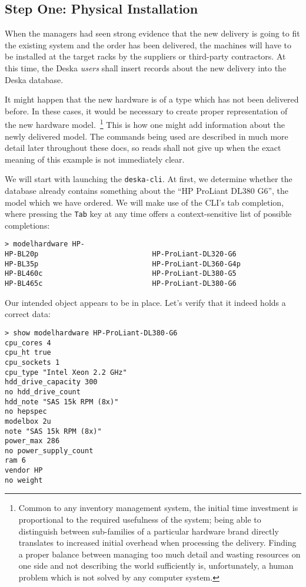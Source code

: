 \documentclass[deska]{subfiles}
\begin{document}
\subsection{Step One: Physical Installation}

When the managers had seen strong evidence that the new delivery is going to fit the existing system and the order has
been delivered, the machines will have to be installed at the target racks by the suppliers or third-party contractors.
At this time, the Deska {\em users} shall insert records about the new delivery into the Deska database.

It might happen that the new hardware is of a type which has not been delivered before.  In these cases, it would be
necessary to create proper representation of the new hardware model.~\footnote{Common to any inventory management
system, the initial time investment is proportional to the required usefulness of the system; being able to distinguish
between sub-families of a particular hardware brand directly translates to increased initial overhead when processing
the delivery.  Finding a proper balance between managing too much detail and wasting resources on one side and not
describing the world sufficiently is, unfortunately, a human problem which is not solved by any computer system.}  This
is how one might add information about the newly delivered model.  The commands being used are described in much more
detail later throughout these docs, so reads shall not give up when the exact meaning of this example is not immediately
clear.

We will start with launching the {\tt deska-cli}.  At first, we determine whether the database already contains
something about the ``HP ProLiant DL380 G6'', the model which we have ordered.  We will make use of the CLI's tab
completion, where pressing the {\tt Tab} key at any time offers a context-sensitive list of possible completions:

\begin{verbatim}
> modelhardware HP-
HP-BL20p                           HP-ProLiant-DL320-G6
HP-BL35p                           HP-ProLiant-DL360-G4p
HP-BL460c                          HP-ProLiant-DL380-G5
HP-BL465c                          HP-ProLiant-DL380-G6
\end{verbatim}

Our intended object appears to be in place.  Let's verify that it indeed holds a correct data:

\begin{verbatim}
> show modelhardware HP-ProLiant-DL380-G6
cpu_cores 4
cpu_ht true
cpu_sockets 1
cpu_type "Intel Xeon 2.2 GHz"
hdd_drive_capacity 300
no hdd_drive_count
hdd_note "SAS 15k RPM (8x)"
no hepspec
modelbox 2u
note "SAS 15k RPM (8x)"
power_max 286
no power_supply_count
ram 6
vendor HP
no weight
\end{verbatim}
\end{document}
